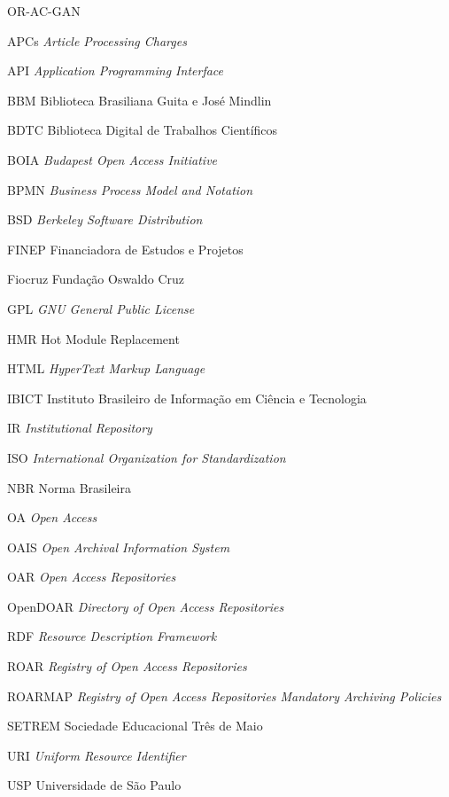 \documentclass[diss]{template/setrem}
\begin{document}
\begin{listofabbrv}{OR-AC-GAN} %
    \item[APCs] {\emph{Article Processing Charges}}
    \item[API] {\emph{Application Programming Interface}}
    \item[BBM] {Biblioteca Brasiliana Guita e José Mindlin}
    \item[BDTC] {Biblioteca Digital de Trabalhos Científicos}
    \item[BOIA] {\emph{Budapest Open Access Initiative}}
    \item[BPMN] {\emph{Business Process Model and Notation}}
    \item[BSD] {\emph{Berkeley Software Distribution}}
    \item[FINEP] {Financiadora de Estudos e Projetos}
    \item[Fiocruz] {Fundação Oswaldo Cruz}
    \item[GPL] {\emph{GNU General Public License}}
    \item[HMR] {Hot Module Replacement}
    \item[HTML] {\emph{HyperText Markup Language}}
    \item[IBICT] {Instituto Brasileiro de Informação em Ciência e Tecnologia}
    \item[IR] {\emph{Institutional Repository}}
    \item[ISO] {\emph{International Organization for Standardization}}
    \item[NBR] {Norma Brasileira}
    \item[OA] {\emph{Open Access}}
    \item[OAIS] {\emph{Open Archival Information System}}
    \item[OAR] {\emph{Open Access Repositories}}
    \item[OpenDOAR] {\emph{Directory of Open Access Repositories}}
    \item[RDF] {\emph{Resource Description Framework }}
    \item[ROAR] {\emph{Registry of Open Access Repositories}}
    \item[ROARMAP] {\emph{Registry of Open Access Repositories Mandatory Archiving Policies}}
    \item[SETREM] {Sociedade Educacional Três de Maio}
    \item[URI] {\emph{Uniform Resource Identifier}}
    \item[USP] {Universidade de São Paulo}
\end{listofabbrv}

% 
\tableofcontents

\pagestyle{empty}
{
    
}


% 
% 


%


\end{document}
